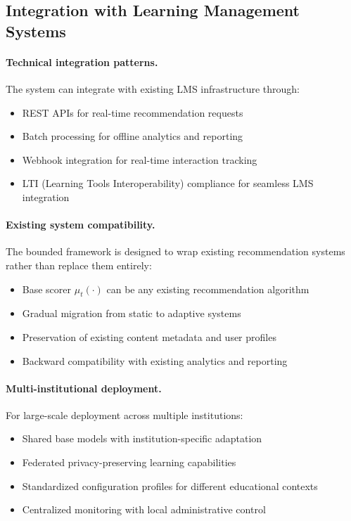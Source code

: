 \subsection{Integration with Learning Management Systems}
\label{app:lms-integration}

\paragraph{Technical integration patterns.} The system can integrate with existing LMS infrastructure through:
\begin{itemize}
  \item REST APIs for real-time recommendation requests
  \item Batch processing for offline analytics and reporting
  \item Webhook integration for real-time interaction tracking
  \item LTI (Learning Tools Interoperability) compliance for seamless LMS integration
\end{itemize}

\paragraph{Existing system compatibility.} The bounded framework is designed to wrap existing recommendation systems rather than replace them entirely:
\begin{itemize}
  \item Base scorer $\mu_t(\cdot)$ can be any existing recommendation algorithm
  \item Gradual migration from static to adaptive systems
  \item Preservation of existing content metadata and user profiles
  \item Backward compatibility with existing analytics and reporting
\end{itemize}

\paragraph{Multi-institutional deployment.} For large-scale deployment across multiple institutions:
\begin{itemize}
  \item Shared base models with institution-specific adaptation
  \item Federated privacy-preserving learning capabilities
  \item Standardized configuration profiles for different educational contexts
  \item Centralized monitoring with local administrative control
\end{itemize}

